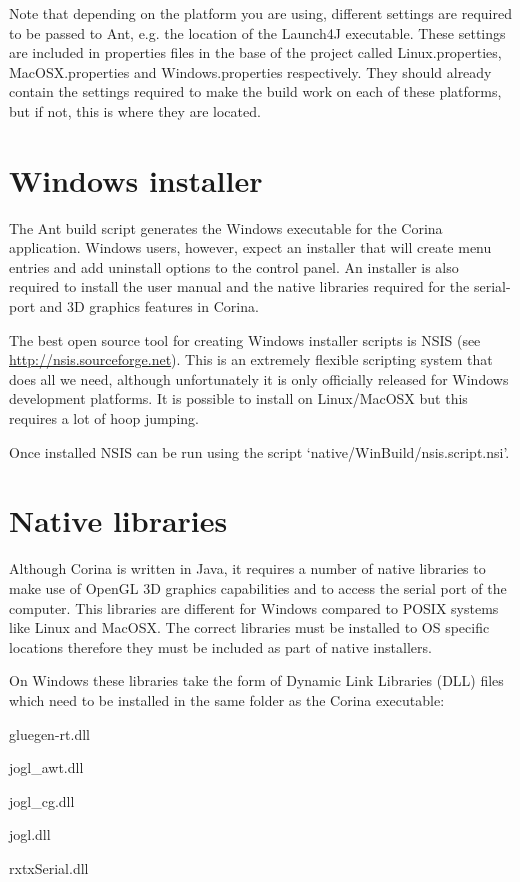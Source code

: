 Note that depending on the platform you are using, different settings are required to be passed to Ant, e.g. the location of the Launch4J executable.  These settings are included in properties files in the base of the project called Linux.properties, MacOSX.properties and Windows.properties respectively.  They should already contain the settings required to make the build work on each of these platforms, but if not, this is where they are located.

\section{Windows installer}
\label{txt:windowsInstaller}
The Ant build script generates the Windows executable for the Corina application.  Windows users, however, expect an installer that will create menu entries and add uninstall options to the control panel.  An installer is also required to install the user manual and the native libraries required for the serial-port and 3D graphics features in Corina.  

The best open source tool for creating Windows installer scripts is NSIS (see \url{http://nsis.sourceforge.net}).  This is an extremely flexible scripting system that does all we need, although unfortunately it is only officially released for Windows development platforms.  It is possible to install on Linux/MacOSX but this requires a lot of hoop jumping.  

Once installed NSIS can be run using the script `native/WinBuild/nsis.script.nsi'.


\section{Native libraries}

Although Corina is written in Java, it requires a number of native libraries to make use of OpenGL 3D graphics capabilities and to access the serial port of the computer.  This libraries are different for Windows compared to POSIX systems like Linux and MacOSX.  The correct libraries must be installed to OS specific locations therefore they must be included as part of native installers.

On Windows these libraries take the form of Dynamic Link Libraries (DLL) files which need to be installed in the same folder as the Corina executable:

\begin{itemize*}
 \item gluegen-rt.dll
 \item jogl\_awt.dll
 \item jogl\_cg.dll
 \item jogl.dll
 \item rxtxSerial.dll
\end{itemize*}

